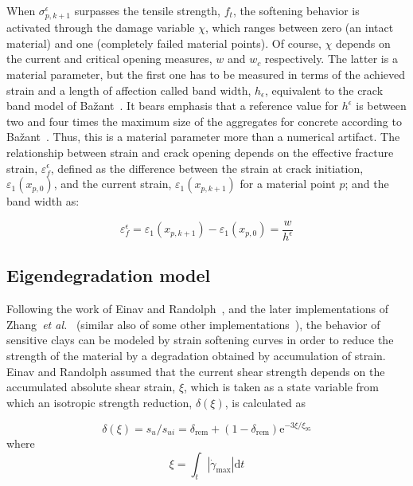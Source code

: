 \documentclass[applsci,journal,article,submit,moreauthors,pdftex]{Definitions/mdpi}
\begin{document}
When $\sigma^{\epsilon}_{p,k+1}$ surpasses the tensile strength, $f_t$,  the softening behavior is activated through the damage variable $\chi$, which ranges between zero (an intact material) and one (completely failed material points). Of course, $\chi$ depends on the current and critical opening measures, $w$ and $w_c$ respectively.  The latter is a material parameter, but the first one has to be measured in terms of the achieved strain and a length of affection called band width, $h_\epsilon$, equivalent to the crack band model of Ba\v{z}ant~\cite{Bazant83}. It bears emphasis that  a reference value for $h^{\epsilon}$ is between two and four times the maximum size of the aggregates for concrete according to Ba\v{z}ant~\cite{Bazant98}. Thus, this is a material parameter more than a numerical artifact. The relationship between strain and crack opening depends on the effective fracture strain, $\varepsilon^{\epsilon}_f$, defined as the difference between the strain at crack initiation, $\varepsilon_1(x_{p,0})$, and the current strain, $ \varepsilon_1(x_{p,k+1})$ for a material point $p$; and the band width as:

\begin{equation} \label{eq15}
 \varepsilon_f^{\epsilon} = \varepsilon_1(x_{p,k+1}) - \varepsilon_1(x_{p,0})  =  \frac{w}{h^{\epsilon}}
\end{equation}

\subsection{Eigendegradation model}
Following the work of Einav and Randolph~\cite{Zhang2015}, and the later implementations of Zhang~\textit{et al.}~\cite{Zhang2015} (similar also of some other implementations~\cite{Wang21,Singh21}), the behavior of sensitive clays can be modeled by strain softening curves in order to reduce the strength of the material by a degradation obtained by accumulation of strain. Einav and Randolph assumed that the current shear strength depends on the accumulated absolute shear strain, $\xi$, which is taken as a state variable from which an isotropic strength reduction, $\delta(\xi)$, is calculated as

\begin{equation} \label{eq16}
\delta(\xi)=s_{u} / s_{u i}=\delta_{\mathrm{rem}}+\left(1-\delta_{\mathrm{rem}}\right) \mathrm{e}^{-3 \xi / \xi_{95}}
\end{equation}
where
\begin{equation}\label{eq17}
\xi=\int_{t}\left|\dot{\gamma}_{\max }\right| \mathrm{d} t
\end{equation}
\end{document}

